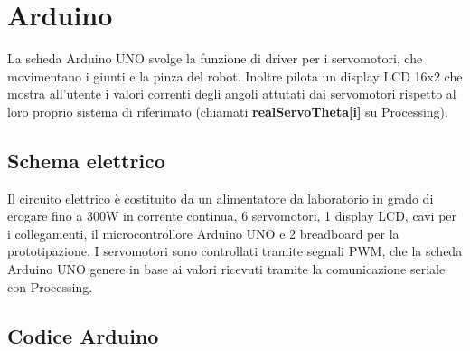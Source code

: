 \documentclass[a4paper]{article}
\begin{document}
    
    
    \section{Arduino}
    
    \begin{text}
        La scheda Arduino UNO svolge la funzione di driver per i servomotori, che movimentano i giunti e la pinza del robot. Inoltre pilota un display LCD 16x2 che mostra all'utente i valori correnti degli angoli attutati dai servomotori rispetto al loro proprio sistema di riferimato (chiamati \textbf{realServoTheta[i]} su Processing).
    \end{text}
    
    \subsection{Schema elettrico}
    
    \begin{text}
        Il circuito elettrico è costituito da un alimentatore da laboratorio in grado di erogare fino a 300W in corrente continua, 6 servomotori, 1 display LCD, cavi per i collegamenti, il microcontrollore Arduino UNO e 2 breadboard per la prototipazione. I servomotori sono controllati tramite segnali PWM, che la scheda Arduino UNO genere in base ai valori ricevuti tramite la comunicazione seriale con Processing.
    \end{text}
    
    \subsection{Codice Arduino}
    
\end{document}
